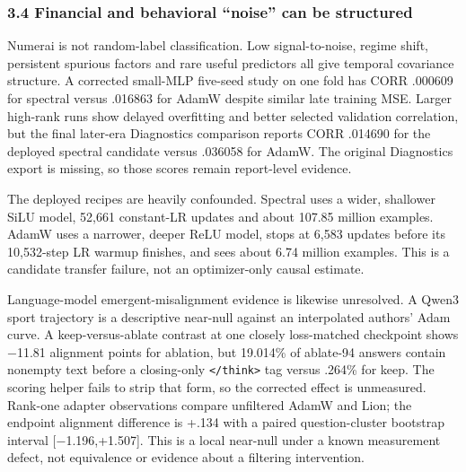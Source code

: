 \documentclass[
  british,
  10pt,
  a4paper,
]{article}
\newcounter{none} %
\begin{document}
\subsubsection{3.4 Financial and behavioral ``noise'' can be
structured}\label{synthesis--financial-and-behavioral-noise-can-be-structured}

Numerai is not random-\allowbreak{}label
classificati\allowbreak{}on.\allowbreak{} Low
signal-\allowbreak{}to-\allowbreak{}noise,\allowbreak{} regime shift,
persistent spurious factors and rare useful predictors all give temporal
covariance structure. A corrected small-MLP five-seed study on one fold
has CORR .000609 for spectral versus .016863 for AdamW despite similar
late training MSE. Larger high-rank runs show delayed overfitting and
better selected validation correlation,\allowbreak{} but the final
later-era Diagnostics comparison reports CORR .014690 for the deployed
spectral candidate versus .036058 for AdamW. The original Diagnostics
export is missing, so those scores remain report-\allowbreak{}level
evidence.

The deployed recipes are heavily confounded.\allowbreak{} Spectral uses
a wider, shallower SiLU model, 52,661 constant-\allowbreak{}LR updates
and about 107.85 million examples. AdamW uses a narrower, deeper ReLU
model, stops at 6,583 updates before its
10,\allowbreak{}532-\allowbreak{}step LR warmup finishes, and sees about
6.74 million examples. This is a candidate transfer failure, not an
optimizer-\allowbreak{}only causal estimate.

Language-\allowbreak{}model
emergent-\allowbreak{}misalignment\allowbreak{} evidence is likewise
unresolved.\allowbreak{} A Qwen3 sport trajectory is a descriptive
near-null against an interpolated authors' Adam curve. A
keep-\allowbreak{}versus-\allowbreak{}ablate contrast at one closely
loss-\allowbreak{}matched checkpoint shows −11.81 alignment points for
ablation, but 19.014\% of ablate-94 answers contain nonempty text before
a closing-\allowbreak{}only \texttt{\textless{}/think\textgreater{}} tag
versus .264\% for keep. The scoring helper fails to strip that form, so
the corrected effect is unmeasured.\allowbreak{} Rank-one adapter
observations compare unfiltered AdamW and Lion; the endpoint alignment
difference is +.134 with a paired question-\allowbreak{}cluster
bootstrap interval
[−1.\allowbreak{}196,\allowbreak{}+1.\allowbreak{}507].\allowbreak{}
This is a local near-null under a known measurement defect, not
equivalence or evidence about a filtering
intervention\allowbreak{}.\allowbreak{}
\end{document}
